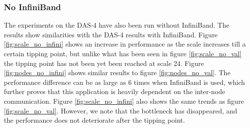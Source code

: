 \subsubsection{No InfiniBand}
The experiments on the DAS-4 have also been run without InfiniBand. The results show similarities with the DAS-4 results with InfiniBand. Figure \ref{fig:scale_no_infini} shows an increase in performance as the scale increases till a certain tipping point, but unlike what has been seen in figure \ref{fig:scale_no_val} the tipping point has not been yet been reached at scale 24.
Figure \ref{fig:nodes_no_infini} shows similar results to figure \ref{fig:nodes_no_val}. The performance difference can be as large as 6 times when InfiniBand is used, which further proves that this application is heavily dependent on the inter-node communication.
Figure \ref{fig:scale_no_infini} also shows the same trends as figure \ref{fig:scale_no_val}. However, we note that the bottleneck has disappeared, and the performance does not deteriorate after the tipping point. 
 
